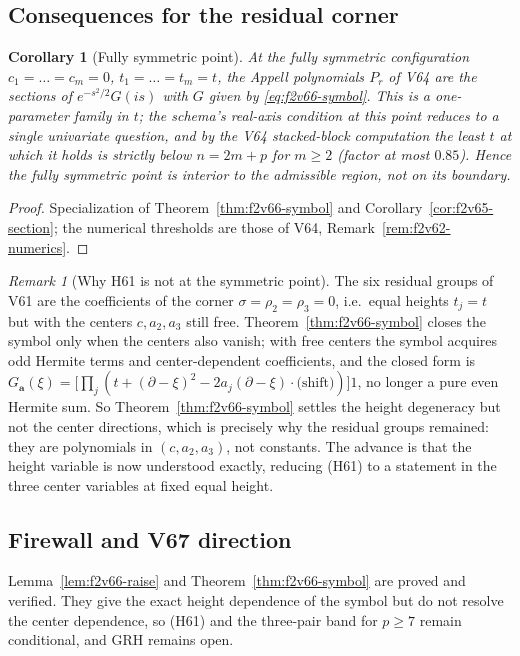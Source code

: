 \documentclass[11pt]{article}
\newtheorem{corollary}[theorem]{Corollary}
\theoremstyle{definition}
\theoremstyle{remark}
\newtheorem{remark}[theorem]{Remark}
\begin{document}
\subsection{Consequences for the residual corner}

\begin{corollary}[Fully symmetric point]
\label{cor:f2v66-symmetric}
At the fully symmetric configuration \(c_1=\dots=c_m=0\),
\(t_1=\dots=t_m=t\), the Appell polynomials \(P_r\) of V64 are the
sections of \(e^{-s^2/2}G(is)\) with \(G\) given by
\eqref{eq:f2v66-symbol}.  This is a one-parameter family in \(t\); the
schema's real-axis condition at this point reduces to a single univariate
question, and by the V64 stacked-block computation the least \(t\) at
which it holds is strictly below \(n=2m+p\) for \(m\ge2\) (factor at most
\(0.85\)).  Hence the fully symmetric point is interior to the admissible
region, not on its boundary.
\end{corollary}

\begin{proof}
Specialization of Theorem~\ref{thm:f2v66-symbol} and
Corollary~\ref{cor:f2v65-section}; the numerical thresholds are those of
V64, Remark~\ref{rem:f2v62-numerics}.
\end{proof}

\begin{remark}[Why H61 is not at the symmetric point]
\label{rem:f2v66-h61}
The six residual groups of V61 are the coefficients of the corner
\(\sigma=\rho_2=\rho_3=0\), i.e.\ equal heights \(t_j=t\) but with the
centers \(c,a_2,a_3\) still free.  Theorem~\ref{thm:f2v66-symbol} closes
the symbol only when the centers also vanish; with free centers the
symbol acquires odd Hermite terms and center-dependent coefficients, and
the closed form is
\(G_{\bm a}(\xi)=\bigl[\prod_j(t+(\partial-\xi)^2-2a_j(\partial-\xi)\cdot
\text{(shift)})\bigr]1\), no longer a pure even Hermite sum.  So
Theorem~\ref{thm:f2v66-symbol} settles the height degeneracy but not the
center directions, which is precisely why the residual groups remained:
they are polynomials in \((c,a_2,a_3)\), not constants.  The advance is
that the height variable is now understood exactly, reducing (H61) to a
statement in the three center variables at fixed equal height.
\end{remark}

\subsection*{Firewall and V67 direction}
\label{fire:f2v66}
Lemma~\ref{lem:f2v66-raise} and Theorem~\ref{thm:f2v66-symbol} are proved
and verified.  They give the exact height dependence of the symbol but do
not resolve the center dependence, so (H61) and the three-pair band for
\(p\ge7\) remain conditional, and GRH remains open.
\end{document}
